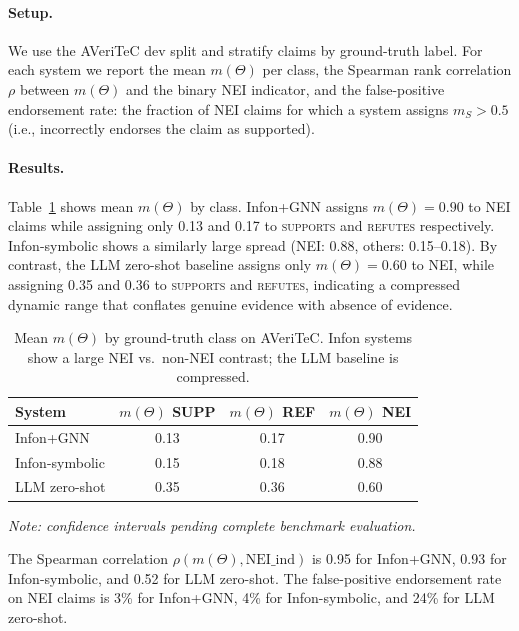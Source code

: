 \paragraph{Setup.}
We use the AVeriTeC dev split and stratify claims by ground-truth label.
For each system we report the mean $m(\Theta)$ per class, the Spearman rank
correlation $\rho$ between $m(\Theta)$ and the binary NEI indicator, and the
false-positive endorsement rate: the fraction of NEI claims for which a
system assigns $m_S > 0.5$ (i.e., incorrectly endorses the claim as
supported).

\paragraph{Results.}
Table~\ref{tab:h2_theta} shows mean $m(\Theta)$ by class.
Infon+GNN assigns $m(\Theta) = 0.90$ to NEI claims while assigning only
0.13 and 0.17 to \textsc{supports} and \textsc{refutes} respectively.
Infon-symbolic shows a similarly large spread (NEI: 0.88, others:
0.15--0.18).  By contrast, the LLM zero-shot baseline assigns only
$m(\Theta) = 0.60$ to NEI, while assigning 0.35 and 0.36 to
\textsc{supports} and \textsc{refutes}, indicating a compressed dynamic
range that conflates genuine evidence with absence of evidence.

\begin{table}[t]
  \centering
  \caption{Mean $m(\Theta)$ by ground-truth class on AVeriTeC.  Infon
    systems show a large NEI vs.\ non-NEI contrast; the LLM baseline is
    compressed.}
  \label{tab:h2_theta}
  \begin{tabular}{lccc}
    \toprule
    System & $m(\Theta)$ SUPP & $m(\Theta)$ REF & $m(\Theta)$ NEI \\
    \midrule
    Infon+GNN       & 0.13 & 0.17 & 0.90 \\
    Infon-symbolic  & 0.15 & 0.18 & 0.88 \\
    LLM zero-shot       & 0.35 & 0.36 & 0.60 \\
    \bottomrule
  \end{tabular}
  \par\smallskip
  \textit{Note: confidence intervals pending complete benchmark evaluation.}
\end{table}

The Spearman correlation $\rho(m(\Theta), \text{NEI\_ind})$ is 0.95 for
Infon+GNN, 0.93 for Infon-symbolic, and 0.52 for LLM zero-shot.
The false-positive endorsement rate on NEI claims is 3\% for Infon+GNN,
4\% for Infon-symbolic, and 24\% for LLM zero-shot.

